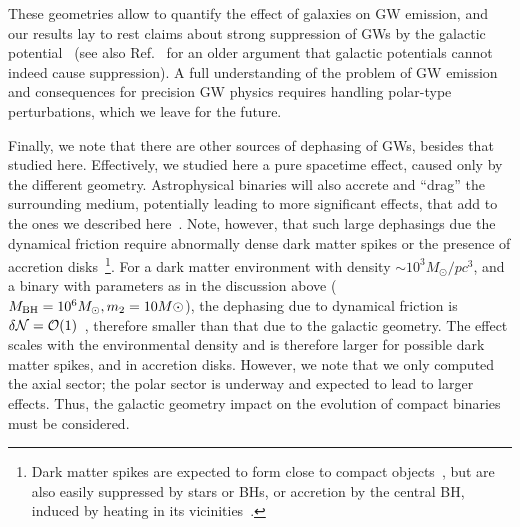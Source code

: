 \documentclass[twocolumn,preprintnumbers,nofootinbib,prd,superscriptaddress,aps]{revtex4-1}
\begin{document}
These geometries allow to quantify the effect of galaxies on GW emission, and our results lay to rest claims about strong suppression of GWs by the galactic potential~\cite{Kundu:1990ze} (see also Ref.~\cite{Price:1992pi} for an older argument that galactic potentials cannot indeed cause suppression).
A full understanding of the problem of GW emission and consequences for precision GW physics requires handling polar-type perturbations, which we leave for the future.


Finally, we note that there are other sources of dephasing of GWs, besides that studied here. Effectively, we studied here a pure spacetime effect, caused only by the different geometry.
Astrophysical binaries will also accrete and ``drag'' the surrounding medium, potentially leading to more significant effects, that add to the ones we described here~\cite{Eda:2013gg,Macedo:2013qea,Barausse:2014tra,Cardoso:2019rou,Annulli:2020lyc,Coogan:2021uqv,Derdzinski:2020wlw,Zwick:2021dlg}. Note, however, that such large dephasings due the dynamical friction require abnormally dense
dark matter spikes or the presence of accretion disks~\footnote{Dark matter spikes are expected to form close to compact objects~\cite{Gondolo:1999ef,Sadeghian:2013laa}, but are also easily suppressed 
by stars or BHs, or accretion by the central BH, induced by heating in its
vicinities~\cite{Merritt:2002vj,Bertone:2005hw,Merritt:2003qk}.}.
%
For a dark matter environment with density $\sim 10^3M_{\odot}/pc^3$, and a binary with parameters as in the discussion above ($M_{\rm BH}=10^6M_\odot, m_2=10M\odot$),
the dephasing due to dynamical friction is $\delta {\cal N}={\cal O}(1)$~\cite{Barausse:2014tra,Cardoso:2019rou}, therefore smaller than that due to the galactic geometry. The effect scales with the environmental density and is therefore larger for possible dark matter spikes, and in accretion disks. However, we note that we only computed the axial sector; the polar sector is underway and expected to lead to larger effects. Thus, the galactic geometry impact on the evolution of compact binaries must be considered.
\end{document}
